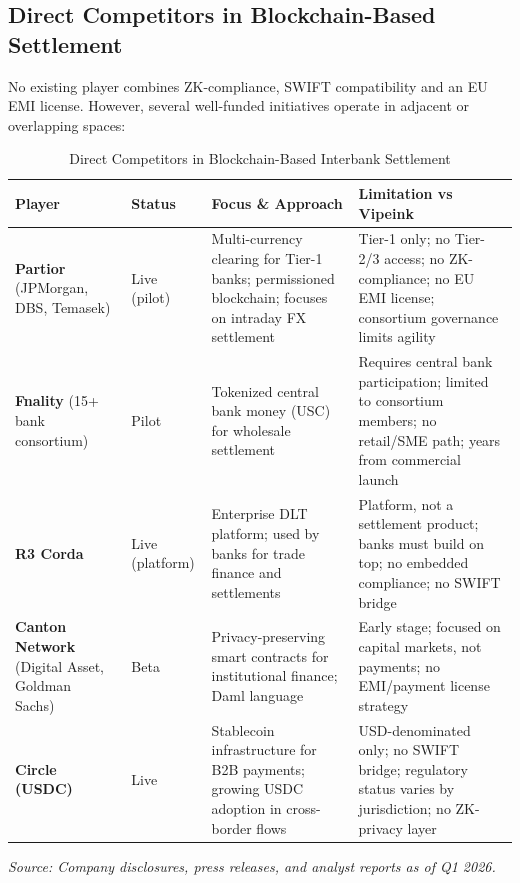 \documentclass[11pt,a4paper]{article}
\newcommand{\tablesource}[1]{%
\par\vspace{3pt}%
{\footnotesize\color{gray!80}\textit{Source: #1}}%
\par\vspace{2pt}%
}
\begin{document}
\subsection*{Direct Competitors in Blockchain-Based Settlement}

No existing player combines ZK-compliance, SWIFT compatibility and an EU EMI license. However, several well-funded initiatives operate in adjacent or overlapping spaces:

\begin{table}[htbp]
\centering
\caption{Direct Competitors in Blockchain-Based Interbank Settlement}
\footnotesize
{}
\begin{tabularx}{\linewidth}{@{}p{2.2cm}p{1.5cm}Xp{3.5cm}@{}}
\toprule
\textbf{Player} & \textbf{Status} & \textbf{Focus \& Approach} & \textbf{Limitation vs Vipeink} \\
\midrule
\textbf{Partior} (JPMorgan, DBS, Temasek)~\cite{partior} & Live (pilot) & Multi-currency clearing for Tier-1 banks; permissioned blockchain; focuses on intraday FX settlement & Tier-1 only; no Tier-2/3 access; no ZK-compliance; no EU EMI license; consortium governance limits agility \\[4pt]
\textbf{Fnality} (15+ bank consortium)~\cite{fnality} & Pilot & Tokenized central bank money (USC) for wholesale settlement & Requires central bank participation; limited to consortium members; no retail/SME path; years from commercial launch \\[4pt]
\textbf{R3 Corda}~\cite{r3_corda} & Live (platform) & Enterprise DLT platform; used by banks for trade finance and settlements & Platform, not a settlement product; banks must build on top; no embedded compliance; no SWIFT bridge \\[4pt]
\textbf{Canton Network} (Digital Asset, Goldman Sachs)~\cite{canton_network} & Beta & Privacy-preserving smart contracts for institutional finance; Daml language & Early stage; focused on capital markets, not payments; no EMI/payment license strategy \\[4pt]
\textbf{Circle (USDC)}~\cite{circle} & Live & Stablecoin infrastructure for B2B payments; growing USDC adoption in cross-border flows & USD-denominated only; no SWIFT bridge; regulatory status varies by jurisdiction; no ZK-privacy layer \\
\bottomrule
\end{tabularx}
\tablesource{Company disclosures, press releases, and analyst reports as of Q1 2026.}
\end{table}
\end{document}
